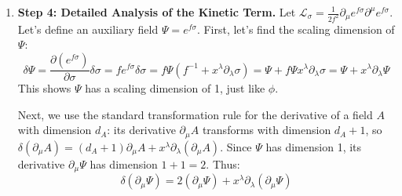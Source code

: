\begin{solution}
\begin{enumerate}
    Next, find the variation of $e^{2f\sigma}$:
    \[ \delta(e^{2f\sigma}) = \frac{\partial(e^{2f\sigma})}{\partial\sigma}\delta\sigma = (2f e^{2f\sigma}) \delta\sigma = 2f e^{2f\sigma} (f^{-1} + x^\lambda\partial_\lambda\sigma) = 2e^{2f\sigma} + 2f e^{2f\sigma} x^\lambda\partial_\lambda\sigma \]
    Recognizing that $x^\lambda \partial_\lambda(e^{2f\sigma}) = 2f e^{2f\sigma} x^\lambda\partial_\lambda\sigma$, we get:
    \[ \delta(e^{2f\sigma}) = 2e^{2f\sigma} + x^\lambda\partial_\lambda(e^{2f\sigma}) \]
    This shows $e^{2f\sigma}$ also has a scaling dimension of 2.

    Now, combine these using the product rule for variations:
    \[ \delta \mathcal{L}_m = - \frac{\mu_0^2}{2} \left[ \delta(\phi^2) e^{2f\sigma} + \phi^2 \delta(e^{2f\sigma}) \right] \]
    \[ \delta \mathcal{L}_m = - \frac{\mu_0^2}{2} \left[ (2\phi^2 + x^\lambda\partial_\lambda(\phi^2)) e^{2f\sigma} + \phi^2 (2e^{2f\sigma} + x^\lambda\partial_\lambda(e^{2f\sigma})) \right] \]
    \[ \delta \mathcal{L}_m = - \frac{\mu_0^2}{2} \left[ 4\phi^2 e^{2f\sigma} + \left( (x^\lambda\partial_\lambda(\phi^2)) e^{2f\sigma} + \phi^2 x^\lambda\partial_\lambda(e^{2f\sigma}) \right) \right] \]
    Using the product rule for derivatives on the last two terms:
    \[ \delta \mathcal{L}_m = - \frac{\mu_0^2}{2} \left[ 4\phi^2 e^{2f\sigma} + x^\lambda\partial_\lambda(\phi^2 e^{2f\sigma}) \right] \]
    Distributing the constant factor gives:
    \[ \delta \mathcal{L}_m = 4 \left( - \frac{\mu_0^2}{2} \phi^2 e^{2f\sigma} \right) + x^\lambda\partial_\lambda \left( - \frac{\mu_0^2}{2} \phi^2 e^{2f\sigma} \right) = 4\mathcal{L}_m + x^\lambda\partial_\lambda \mathcal{L}_m \]
    This confirms that $\mathcal{L}_m$ has a scaling dimension of 4.

    \item \textbf{Step 4: Detailed Analysis of the Kinetic Term.}
    Let $\mathcal{L}_\sigma = \frac{1}{2f^2} \partial_\mu e^{f\sigma} \partial^\mu e^{f\sigma}$. Let's define an auxiliary field $\Psi = e^{f\sigma}$.
    First, let's find the scaling dimension of $\Psi$:
    \[ \delta\Psi = \frac{\partial(e^{f\sigma})}{\partial\sigma}\delta\sigma = f e^{f\sigma}\delta\sigma = f\Psi(f^{-1} + x^\lambda\partial_\lambda\sigma) = \Psi + f\Psi x^\lambda\partial_\lambda\sigma = \Psi + x^\lambda\partial_\lambda\Psi \]
    This shows $\Psi$ has a scaling dimension of 1, just like $\phi$.

    Next, we use the standard transformation rule for the derivative of a field $A$ with dimension $d_A$: its derivative $\partial_\mu A$ transforms with dimension $d_A+1$, so $\delta(\partial_\mu A) = (d_A+1)\partial_\mu A + x^\lambda\partial_\lambda(\partial_\mu A)$.
    Since $\Psi$ has dimension 1, its derivative $\partial_\mu\Psi$ has dimension $1+1=2$. Thus:
    \[ \delta(\partial_\mu\Psi) = 2(\partial_\mu\Psi) + x^\lambda\partial_\lambda(\partial_\mu\Psi) \]
    

\end{enumerate}
\end{solution}
